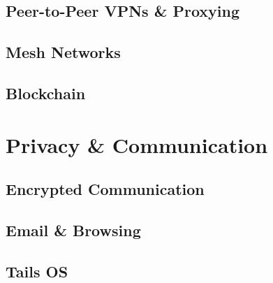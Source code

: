 \subsection{Peer-to-Peer VPNs \& Proxying}
\subsection{Mesh Networks}
\subsection{Blockchain}




\section{Privacy \& Communication}

\subsection{Encrypted Communication}
\subsection{Email \& Browsing}
\subsection{Tails OS}




\section{}

\subsection{}
\subsection{}
\subsection{}